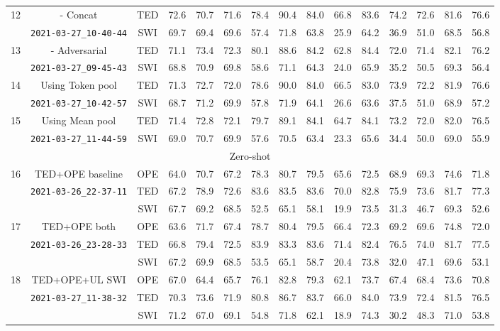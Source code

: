 \documentclass[a4paper]{article}
\begin{document}
\begin{multicols}{2}
\begin{table*}[t]
\begin{tabular}{|c|c|c|c c c|c c c|c c c|c c c|}
\multirow{2}{*}{12}&
- Concat&TED&72.6&70.7&71.6&78.4&90.4&84.0&66.8&83.6&74.2&72.6&81.6&76.6\\&
\verb|2021-03-27_10-40-44|&SWI&69.7&69.4&69.6&57.4&71.8&63.8&25.9&64.2&36.9&51.0&68.5&56.8\\\hline

\multirow{2}{*}{13}&
- Adversarial&TED&71.1&73.4&72.3&80.1&88.6&84.2&62.8&84.4&72.0&71.4&82.1&76.2\\&
\verb|2021-03-27_09-45-43|&SWI&68.8&70.9&69.8&58.6&71.1&64.3&24.0&65.9&35.2&50.5&69.3&56.4\\\hline


\multirow{2}{*}{14}&
Using Token pool&TED&71.3&72.7&72.0&78.6&90.0&84.0&66.5&83.0&73.9&72.2&81.9&76.6\\&
\verb|2021-03-27_10-42-57|&SWI&68.7&71.2&69.9&57.8&71.9&64.1&26.6&63.6&37.5&51.0&68.9&57.2\\\hline

\multirow{2}{*}{15}&
Using Mean pool&TED&71.4&72.8&72.1&79.7&89.1&84.1&64.7&84.1&73.2&72.0&82.0&76.5\\&
\verb|2021-03-27_11-44-59|&SWI&69.0&70.7&69.9&57.6&70.5&63.4&23.3&65.6&34.4&50.0&69.0&55.9\\\hline


\multicolumn{15}{|c|}{Zero-shot}\\\hline
\multirow{2}{*}{16}&
TED+OPE baseline&OPE&64.0&70.7&67.2&78.3&80.7&79.5&65.6&72.5&68.9&69.3&74.6&71.8\\&
\verb|2021-03-26_22-37-11|&TED&67.2&78.9&72.6&83.6&83.5&83.6&70.0&82.8&75.9&73.6&81.7&77.3\\
&&SWI&67.7&69.2&68.5&52.5&65.1&58.1&19.9&73.5&31.3&46.7&69.3&52.6\\\hline

\multirow{2}{*}{17}&
TED+OPE both&OPE&63.6&71.7&67.4&78.7&80.4&79.5&66.4&72.3&69.2&69.6&74.8&72.0\\&
\verb|2021-03-26_23-28-33|&TED&66.8&79.4&72.5&83.9&83.3&83.6&71.4&82.4&76.5&74.0&81.7&77.5\\
&&SWI&67.2&69.9&68.5&53.5&65.1&58.7&20.4&73.8&32.0&47.1&69.6&53.1\\\hline

\multirow{2}{*}{18}&
TED+OPE+UL SWI&OPE&67.0&64.4&65.7&76.1&82.8&79.3&62.1&73.7&67.4&68.4&73.6&70.8\\&
\verb|2021-03-27_11-38-32|&TED&70.3&73.6&71.9&80.8&86.7&83.7&66.0&84.0&73.9&72.4&81.5&76.5\\
&&SWI&71.2&67.0&69.1&54.8&71.8&62.1&18.9&74.3&30.2&48.3&71.0&53.8\\\hline


\end{tabular}
\end{table*}
\end{multicols}
\end{document}
